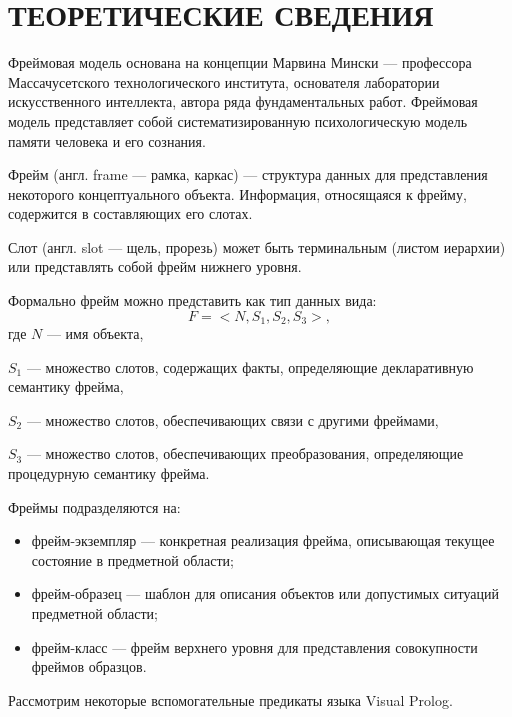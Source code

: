 \section{ТЕОРЕТИЧЕСКИЕ СВЕДЕНИЯ}

Фреймовая модель основана на концепции Марвина Мински ---
профессора Массачусетского технологического института,
основателя лаборатории искусственного интеллекта,
автора ряда фундаментальных работ.
Фреймовая модель представляет собой систематизированную
психологическую модель памяти человека и его сознания.

Фрейм (англ. frame --- рамка, каркас) --- структура данных
для представления некоторого концептуального объекта.
Информация, относящаяся к фрейму, содержится в составляющих его слотах.

Слот (англ. slot --- щель, прорезь) может быть терминальным (листом иерархии)
или представлять собой фрейм нижнего уровня.

Формально фрейм можно представить как тип данных вида:
\begin{equation*}
  F = < N, S_1, S_2, S_3 >,
\end{equation*}
где \hspace{2mm} $N$ --- имя объекта, \par
$S_1$ --- множество слотов, содержащих факты, определяющие декларативную семантику фрейма, \par
$S_2$ --- множество слотов, обеспечивающих связи с другими фреймами, \par
$S_3$ --- множество слотов, обеспечивающих преобразования, определяющие процедурную семантику фрейма.

Фреймы подразделяются на:
\begin{itemize}
  \item фрейм-экземпляр --- конкретная реализация фрейма, описывающая текущее состояние в предметной области;
  \item фрейм-образец --- шаблон для описания объектов или допустимых ситуаций предметной области;
  \item фрейм-класс --- фрейм верхнего уровня для представления совокупности фреймов образцов.
\end{itemize}

Рассмотрим некоторые вспомогательные предикаты языка Visual Prolog.

